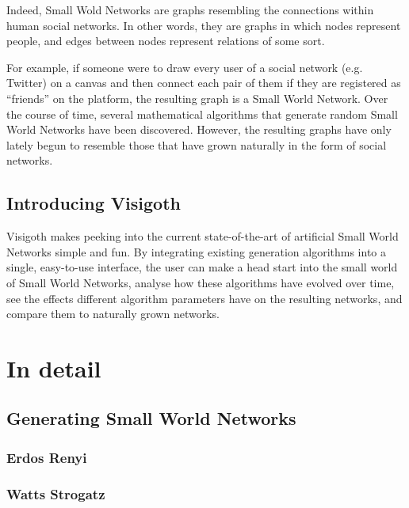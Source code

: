 \documentclass[a4paper,11pt,titlepage]{article}
\let\stdsection\section         %
\renewcommand{\section}{\newpage\stdsection}
\begin{document}
Indeed, Small Wold Networks are graphs resembling the connections
within human social networks. In other words, they are graphs in which
nodes represent people, and edges between nodes represent relations of
some sort.

For example, if someone were to draw every user of a social network
(e.g. Twitter) on a canvas and then connect each pair of them if they
are registered as ``friends'' on the platform, the resulting graph is a
Small World Network.  Over the course of time, several mathematical
algorithms that generate random Small World Networks have been
discovered. However, the resulting graphs have only lately begun to
resemble those that have grown naturally in the form of social
networks.

\subsection{Introducing Visigoth}

Visigoth makes peeking into the current state-of-the-art of artificial
Small World Networks simple and fun. By integrating existing
generation algorithms into a single, easy-to-use interface, the user
can make a head start into the small world of Small World Networks,
analyse how these algorithms have evolved over time, see the effects
different algorithm parameters have on the resulting networks, and
compare them to naturally grown networks.

\section{In detail}

\subsection{Generating Small World Networks}

\subsubsection{Erdos Renyi}

\subsubsection{Watts Strogatz}
\end{document}
